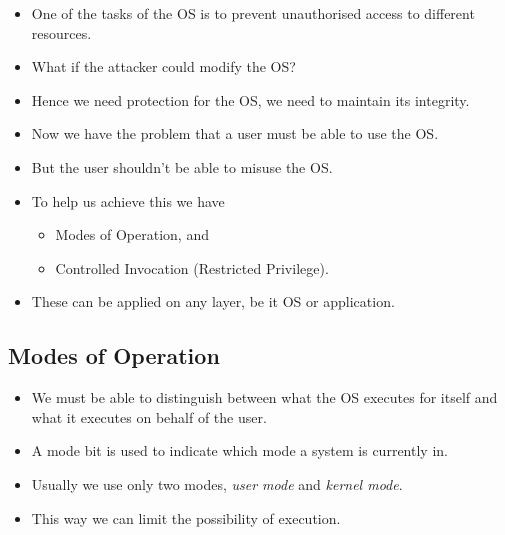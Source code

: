 \documentclass{beamer}
\begin{document}
\begin{frame}{\insertsubsectionhead}
  \begin{itemize}
    \item One of the tasks of the OS is to prevent unauthorised access to 
      different resources.

    \item What if the attacker could modify the OS\@?

    \item Hence we need protection for the OS, we need to maintain its 
      integrity.

  \end{itemize}
\end{frame}

\begin{frame}{\insertsubsectionhead}
  \begin{itemize}
    \item Now we have the problem that a user must be able to use the OS\@.

    \item But the user shouldn't be able to misuse the OS\@.

    \item To help us achieve this we have
      \begin{itemize}
        \item Modes of Operation, and
        \item Controlled Invocation (Restricted Privilege).
      \end{itemize}

    \item These can be applied on any layer, be it OS or application.

  \end{itemize}
\end{frame}

\subsection{Modes of Operation}

\begin{frame}{\insertsubsectionhead}
  \begin{itemize}
    \item We must be able to distinguish between what the OS executes for 
      itself and what it executes on behalf of the user.

    \item A mode bit is used to indicate which mode a system is currently in.

    \item Usually we use only two modes, \emph{user mode} and \emph{kernel 
      mode}.

    \item This way we can limit the possibility of execution.

  \end{itemize}
\end{frame}
\end{document}
